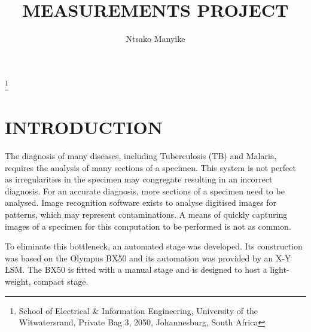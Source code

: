 \documentclass[10pt,twocolumn]{witseiepaper}
\begin{document}
\title{MEASUREMENTS PROJECT}

\author{Ntsako Manyike}

\thanks{School of Electrical \& Information Engineering, University of the
Witwatersrand, Private Bag 3, 2050, Johannesburg, South Africa}



%



\maketitle
\thispagestyle{empty}\pagestyle{empty}


%
\section{INTRODUCTION}

The diagnosis of many diseases, including Tuberculosis (TB) and Malaria,
requires the analysis of many sections of a specimen.  This system is not
perfect as irregularities in the specimen may congregate resulting in an
incorrect diagnosis.  For an accurate diagnosis, more sections of a specimen
need to be analysed.  Image recognition software exists to analyse digitised
images for patterns, which may represent contaminations.  A means of quickly
capturing images of a specimen for this computation to be performed is not as
common.  

To eliminate this bottleneck, an automated stage was developed.  Its
construction was based on the Olympus BX50 \cite{Olympus} and its automation
was provided by an X-Y LSM.  The BX50 is fitted with a manual stage and is
designed to host a light-weight, compact stage.
\end{document}
